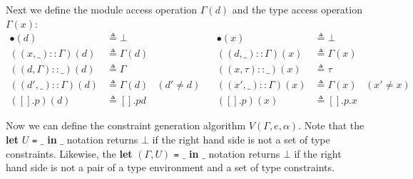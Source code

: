 \documentclass{article}
\theoremstyle{definition}
\newcommand*{\cons}{::}
\newcommand*{\modid}{d}
\begin{document}
Next we define the module access operation $\Gamma(\modid)$ and the type access operation $\Gamma(x)$:
\begin{align*}
  \bullet(\modid)                   & \triangleq\bot           &            &  & \bullet(x)                  & \triangleq\bot                   \\
  ((x,\_)\cons\Gamma)(\modid)       & \triangleq\Gamma(\modid) &            &  & ((\modid,\_)\cons\Gamma)(x) & \triangleq\Gamma(x)              \\
  ((\modid,\Gamma)\cons\_)(\modid)  & \triangleq\Gamma         &            &  & ((x,\tau)\cons\_)(x)        & \triangleq\tau                   \\
  ((\modid',\_)\cons\Gamma)(\modid) & \triangleq\Gamma(\modid) & (d'\neq d) &  & ((x',\_)\cons\Gamma)(x)     & \triangleq\Gamma(x) & (x'\neq x) \\
  ([].p)(\modid)                    & \triangleq[].pd          &            &  & ([].p)(x)                   & \triangleq[].p.x
\end{align*}

Now we can define the constraint generation algorithm $V(\Gamma,e,\alpha)$.
Note that the \textbf{let} $U$ \texttt{=} $\_$ \textbf{in} $\_$ notation returns $\bot$ if the right hand side is not a set of type constraints.
Likewise, the \textbf{let} $(\Gamma,U)$ \texttt{=} $\_$ \textbf{in} $\_$ notation returns $\bot$ if the right hand side is not a pair of a type environment and a set of type constraints.
\end{document}
